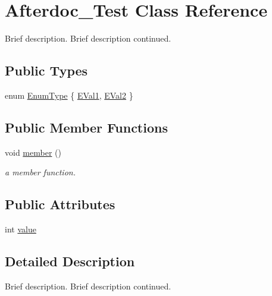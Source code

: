 \hypertarget{classAfterdoc__Test}{}\section{Afterdoc\+\_\+\+Test Class Reference}
\label{classAfterdoc__Test}


Brief description. Brief description continued.  


\subsection*{Public Types}
\begin{DoxyCompactItemize}
\item 
enum \mbox{\hyperlink{classAfterdoc__Test_adab0cd7ad3b4875e245ca8f6238a388a}{Enum\+Type}} \{ \mbox{\hyperlink{classAfterdoc__Test_adab0cd7ad3b4875e245ca8f6238a388aae054276790e35692ad0abe10c5b75da4}{E\+Val1}}, 
\mbox{\hyperlink{classAfterdoc__Test_adab0cd7ad3b4875e245ca8f6238a388aac849f37624d8d2d68ca72c4a8df9cf99}{E\+Val2}}
 \}
\end{DoxyCompactItemize}
\subsection*{Public Member Functions}
\begin{DoxyCompactItemize}
\item 
\mbox{\label{classAfterdoc__Test_a57ba94e9039ee90a1b191ae0009a05dd}} 
void \mbox{\hyperlink{classAfterdoc__Test_a57ba94e9039ee90a1b191ae0009a05dd}{member}} ()
\begin{DoxyCompactList}\small\item\em a member function. \end{DoxyCompactList}\end{DoxyCompactItemize}
\subsection*{Public Attributes}
\begin{DoxyCompactItemize}
\item 
int \mbox{\hyperlink{classAfterdoc__Test_a9287a08830e5cdfd9c732bb7932694a0}{value}}
\end{DoxyCompactItemize}


\subsection{Detailed Description}
Brief description. Brief description continued. 

